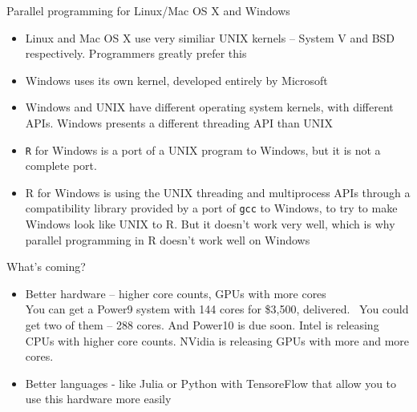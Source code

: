 \documentclass{beamer}
\begin{document}
\begin{frame}{Parallel programming for Linux/Mac OS X and Windows}
	\begin{itemize}
		\item Linux and Mac OS X use very similiar UNIX kernels -- System V and BSD respectively. Programmers greatly prefer this
		\item Windows uses its own kernel, developed entirely by Microsoft
		\item Windows and UNIX have different operating system kernels, with different APIs. Windows presents a different threading API than UNIX
		\item \texttt{R} for Windows is a port of a UNIX program to Windows, but it is not a complete port.
		\item R for Windows is using the UNIX threading and multiprocess APIs through a compatibility library provided by a port of \texttt{gcc} to Windows, to try to make Windows look like UNIX to R.  But it doesn't work very well, which is why parallel programming in R doesn't work well on Windows
	\end{itemize}
\end{frame}

\begin{frame}{What's coming?}
	\begin{itemize}
		\item Better hardware -- higher core counts, GPUs with more cores \\
			You can get a Power9 system with 144 cores for \$3,500, delivered.
			\
			You could get two of them -- 288 cores. And Power10 is due soon.
			Intel is releasing CPUs with higher core counts.
			NVidia is releasing GPUs with more and more cores.
	\note{Show \texttt{htop} for a Power9 system}
		\item Better languages - like Julia or Python with TensoreFlow that
			allow you to use this hardware more easily
	\end{itemize}
\end{frame}
\end{document}

